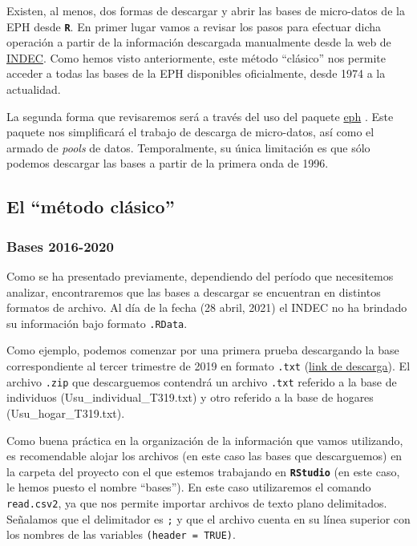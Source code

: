 \documentclass[
]{book}
\begin{document}
Existen, al menos, dos formas de descargar y abrir las bases de micro-datos de la EPH desde \textbf{\texttt{R}}. En primer lugar vamos a revisar los pasos para efectuar dicha operación a partir de la información descargada manualmente desde la web de \href{https://www.indec.gob.ar/indec/web/Institucional-Indec-BasesDeDatos}{INDEC}. Como hemos visto anteriormente, este método ``clásico'' nos permite acceder a todas las bases de la EPH disponibles oficialmente, desde 1974 a la actualidad.

La segunda forma que revisaremos será a través del uso del paquete \href{https://github.com/holatam/eph}{eph} \citep{kozlowski2020}. Este paquete nos simplificará el trabajo de descarga de micro-datos, así como el armado de \emph{pools} de datos. Temporalmente, su única limitación es que sólo podemos descargar las bases a partir de la primera onda de 1996.

\hypertarget{el-muxe9todo-cluxe1sico}{%
\subsection{El ``método clásico''}\label{el-muxe9todo-cluxe1sico}}

\hypertarget{bases-2016-2020}{%
\subsubsection{Bases 2016-2020}\label{bases-2016-2020}}

Como se ha presentado previamente, dependiendo del período que necesitemos analizar, encontraremos que las bases a descargar se encuentran en distintos formatos de archivo. Al día de la fecha (28 abril, 2021) el INDEC no ha brindado su información bajo formato \texttt{.RData}.

Como ejemplo, podemos comenzar por una primera prueba descargando la base correspondiente al tercer trimestre de 2019 en formato \texttt{.txt} (\href{https://www.indec.gob.ar/ftp/cuadros/menusuperior/eph/EPH_usu_3_Trim_2019_txt.zip}{link de descarga}). El archivo \texttt{.zip} que descarguemos contendrá un archivo \texttt{.txt} referido a la base de individuos (Usu\_individual\_T319.txt) y otro referido a la base de hogares (Usu\_hogar\_T319.txt).

Como buena práctica en la organización de la información que vamos utilizando, es recomendable alojar los archivos (en este caso las bases que descarguemos) en la carpeta del proyecto con el que estemos trabajando en \textbf{\texttt{RStudio}} (en este caso, le hemos puesto el nombre ``bases''). En este caso utilizaremos el comando \texttt{read.csv2}, ya que nos permite importar archivos de texto plano delimitados. Señalamos que el delimitador es \texttt{;} y que el archivo cuenta en su línea superior con los nombres de las variables \texttt{(header\ =\ TRUE)}.
\end{document}
